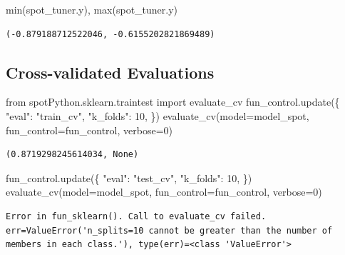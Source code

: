 \documentclass[
  letterpaper,
  DIV=11,
  numbers=noendperiod]{scrreprt}
\newenvironment{Shaded}{\begin{snugshade}}{\end{snugshade}}
\newcommand{\BuiltInTok}[1]{\textcolor[rgb]{0.00,0.23,0.31}{#1}}
\newcommand{\DecValTok}[1]{\textcolor[rgb]{0.68,0.00,0.00}{#1}}
\newcommand{\ImportTok}[1]{\textcolor[rgb]{0.00,0.46,0.62}{#1}}
\newcommand{\NormalTok}[1]{\textcolor[rgb]{0.00,0.23,0.31}{#1}}
\newcommand{\OperatorTok}[1]{\textcolor[rgb]{0.37,0.37,0.37}{#1}}
\newcommand{\StringTok}[1]{\textcolor[rgb]{0.13,0.47,0.30}{#1}}
\begin{document}
\begin{Shaded}
\begin{Highlighting}[]
\BuiltInTok{min}\NormalTok{(spot\_tuner.y), }\BuiltInTok{max}\NormalTok{(spot\_tuner.y)}
\end{Highlighting}
\end{Shaded}

\begin{verbatim}
(-0.879188712522046, -0.6155202821869489)
\end{verbatim}

\hypertarget{cross-validated-evaluations}{%
\subsection{Cross-validated
Evaluations}\label{cross-validated-evaluations}}

\begin{Shaded}
\begin{Highlighting}[]
\ImportTok{from}\NormalTok{ spotPython.sklearn.traintest }\ImportTok{import}\NormalTok{ evaluate\_cv}
\NormalTok{fun\_control.update(\{}
     \StringTok{"eval"}\NormalTok{: }\StringTok{"train\_cv"}\NormalTok{,}
     \StringTok{"k\_folds"}\NormalTok{: }\DecValTok{10}\NormalTok{,}
\NormalTok{\})}
\NormalTok{evaluate\_cv(model}\OperatorTok{=}\NormalTok{model\_spot, fun\_control}\OperatorTok{=}\NormalTok{fun\_control, verbose}\OperatorTok{=}\DecValTok{0}\NormalTok{)}
\end{Highlighting}
\end{Shaded}

\begin{verbatim}
(0.8719298245614034, None)
\end{verbatim}

\begin{Shaded}
\begin{Highlighting}[]
\NormalTok{fun\_control.update(\{}
     \StringTok{"eval"}\NormalTok{: }\StringTok{"test\_cv"}\NormalTok{,}
     \StringTok{"k\_folds"}\NormalTok{: }\DecValTok{10}\NormalTok{,}
\NormalTok{\})}
\NormalTok{evaluate\_cv(model}\OperatorTok{=}\NormalTok{model\_spot, fun\_control}\OperatorTok{=}\NormalTok{fun\_control, verbose}\OperatorTok{=}\DecValTok{0}\NormalTok{)}
\end{Highlighting}
\end{Shaded}

\begin{verbatim}
Error in fun_sklearn(). Call to evaluate_cv failed. err=ValueError('n_splits=10 cannot be greater than the number of members in each class.'), type(err)=<class 'ValueError'>
\end{verbatim}
\end{document}
